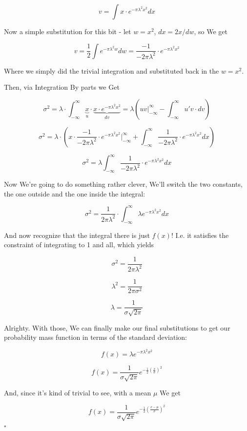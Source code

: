 \documentclass{article}
\newcommand{\qed}{\hfill$\square$}
\begin{document}
		\[ v = \int x\cdot e^{-\pi\lambda^2x^2} dx \] 
		
		Now a simple substitution for this bit - let $w = x^2$, $dx = 2x/dw$, so We get
		
		\[ v = \frac{1}{2}\int e^{-\pi\lambda^2w} dw = \frac{-1}{-2\pi\lambda^2}\cdot e^{-\pi\lambda^2x^2}  \]
		
		Where we simply did the trivial integration and substituted back in the $w=x^2$.
		
		Then, via Integration By parts we Get
		
		\[ \sigma^2 = \lambda\cdot\int^{\infty}_{-\infty} \underbrace{x}_u\cdot \underbrace{x\cdot  e^{-\pi\lambda^2x^2}}_{dv} = \lambda\left( uv \big|^\infty_{-\infty} - \int^\infty_{-\infty} u' v\cdot dv\right) \]
		
		\[ \sigma^2 = \lambda \cdot \left( x\cdot \frac{-1}{-2\pi\lambda^2}\cdot e^{-\pi\lambda^2x^2}\bigg|^\infty_{-\infty} + \int^\infty_{-\infty} \frac{1}{-2\pi\lambda^2}\cdot e^{-\pi\lambda^2x^2} dx \right) \]
		
		\[ \sigma^2 = \lambda \int^\infty_{-\infty} \frac{1}{-2\pi\lambda^2}\cdot e^{-\pi\lambda^2x^2} dx  \]
		
		Now We're going to do something rather clever, We'll switch the two constants, the one outside and the one inside the integral:
		
		
		\[ \sigma^2 = \frac{1}{2\pi\lambda^2}\cdot \int^\infty_{-\infty} \lambda e^{-\pi\lambda^2x^2} dx  \]
		
		And now recognize that the integral there is just $f(x)$! I.e. it satisfies the constraint of integrating to 1 and all, which yields
		
		\[ \sigma^2 = \frac{1}{2\pi\lambda^2}  \]
		
		\[ \lambda^2 = \frac{1}{2\pi\sigma^2} \]
		
		\[ \lambda = \frac{1}{\sigma\sqrt{2\pi}} \]
		
		Alrighty. With those, We can finally make our final substitutions to get our probability mass function in terms of the standard deviation:
		
		\[ f(x) = \lambda e^{-\pi\lambda^2x^2} \]
		
		\[ f(x) = \frac{1}{\sigma\sqrt{2\pi}} e^{-\frac{1}{2}\left(\frac{x}{\sigma}\right)^2 } \]
		
		And, since it's kind of trivial to see, with a mean $\mu$ We get
		
		\[ f(x) = \frac{1}{\sigma\sqrt{2\pi}} e^{-\frac{1}{2}\left(\frac{x-\mu}{\sigma}\right)^2 } \]\qed		
		
\end{document}
